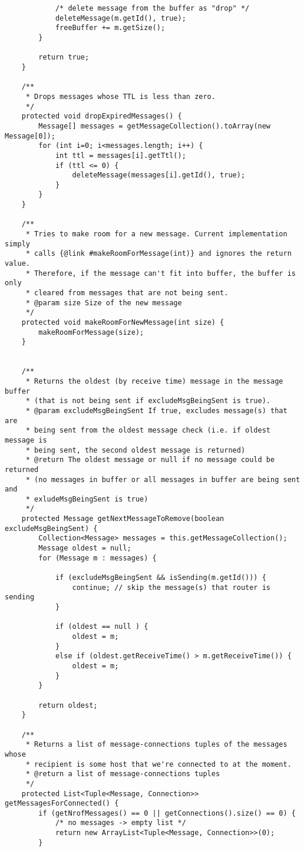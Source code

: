 \documentclass[11pt]{icsthesis}
\begin{document}
\begin{framed}
\begin{verbatim}
			/* delete message from the buffer as "drop" */
			deleteMessage(m.getId(), true);
			freeBuffer += m.getSize();
		}
		
		return true;
	}
	
	/**
	 * Drops messages whose TTL is less than zero.
	 */
	protected void dropExpiredMessages() {
		Message[] messages = getMessageCollection().toArray(new Message[0]);
		for (int i=0; i<messages.length; i++) {
			int ttl = messages[i].getTtl(); 
			if (ttl <= 0) {
				deleteMessage(messages[i].getId(), true);
			}
		}
	}
	
	/**
	 * Tries to make room for a new message. Current implementation simply
	 * calls {@link #makeRoomForMessage(int)} and ignores the return value.
	 * Therefore, if the message can't fit into buffer, the buffer is only 
	 * cleared from messages that are not being sent.
	 * @param size Size of the new message
	 */
	protected void makeRoomForNewMessage(int size) {
		makeRoomForMessage(size);
	}

	
	/**
	 * Returns the oldest (by receive time) message in the message buffer 
	 * (that is not being sent if excludeMsgBeingSent is true).
	 * @param excludeMsgBeingSent If true, excludes message(s) that are
	 * being sent from the oldest message check (i.e. if oldest message is
	 * being sent, the second oldest message is returned)
	 * @return The oldest message or null if no message could be returned
	 * (no messages in buffer or all messages in buffer are being sent and
	 * exludeMsgBeingSent is true)
	 */
	protected Message getNextMessageToRemove(boolean excludeMsgBeingSent) {
		Collection<Message> messages = this.getMessageCollection();
		Message oldest = null;
		for (Message m : messages) {
			
			if (excludeMsgBeingSent && isSending(m.getId())) {
				continue; // skip the message(s) that router is sending
			}
			
			if (oldest == null ) {
				oldest = m;
			}
			else if (oldest.getReceiveTime() > m.getReceiveTime()) {
				oldest = m;
			}
		}
		
		return oldest;
	}
	
	/**
	 * Returns a list of message-connections tuples of the messages whose
	 * recipient is some host that we're connected to at the moment.
	 * @return a list of message-connections tuples
	 */
	protected List<Tuple<Message, Connection>> getMessagesForConnected() {
		if (getNrofMessages() == 0 || getConnections().size() == 0) {
			/* no messages -> empty list */
			return new ArrayList<Tuple<Message, Connection>>(0); 
		}


\end{verbatim}
\end{framed}
\end{document}
